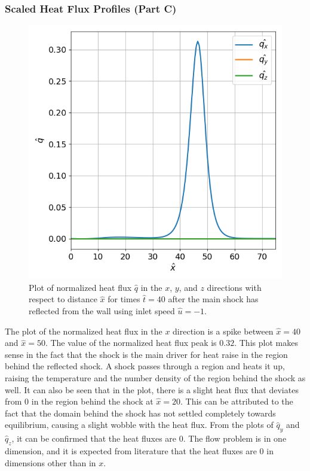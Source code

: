 \documentclass[a4paper]{article}
\begin{document}
\subsubsection{Scaled Heat Flux Profiles (Part C)}
\begin{figure}[hbt!]
    \centering
    \includegraphics[width=14cm]{plots/problem_c.png}
    \caption{\centering Plot of normalized heat flux $\hat{q}$ in the $x$, $y$, and $z$ directions with respect to distance $\hat{x}$ for times $\hat{t} = 40$ after the main shock has reflected from the wall using inlet speed $\hat{u} = -1$.}
    \label{problem_c}
\end{figure}
The plot of the normalized heat flux in the $x$ direction is a spike between $\hat{x} = 40$ and $\hat{x} = 50$. The value of the normalized heat flux peak is $0.32$. This plot makes sense in the fact that the shock is the main driver for heat raise in the region behind the reflected shock. A shock passes through a region and heats it up, raising the temperature and the number density of the region behind the shock as well. It can also be seen that in the plot, there is a slight heat flux that deviates from 0 in the region behind the shock at $\hat{x} = 20$. This can be attributed to the fact that the domain behind the shock has not settled completely towards equilibrium, causing a slight wobble with the heat flux. From the plots of $\hat{q}_y$ and $\hat{q}_z$, it can be confirmed that the heat fluxes are 0. The flow problem is in one dimension, and it is expected from literature that the heat fluxes are 0 in dimensions other than in $x$.
\clearpage
\end{document}
